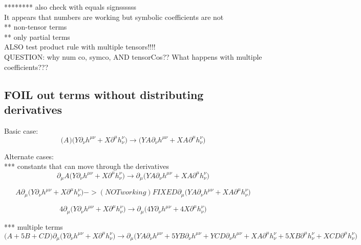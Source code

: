 \documentclass{article}
\def\){\Big)}
\def\({\Big(}
\begin{document}
******** also check with equals signssssss\\
It appears that numbers are working but symbolic coefficients are not\\
** non-tensor terms\\
** only partial terms\\

ALSO test product rule with multiple tensors!!!!\\

QUESTION: why num co, symco, AND tensorCos?? What happens with multiple coefficients???\\

 \subsection{FOIL out terms without distributing derivatives}
Basic case: 
\begin{equation}
\(A^{}\) \(Y \partial_{\nu}h^{\mu \nu} + X \partial^{\mu} h^{\nu }_{\nu}\)  \rightarrow \(Y A^{} \partial_{\nu}h^{\mu \nu} +X A^{} \partial^{\mu}h_{\nu}^{\nu} \)
\end{equation}

Alternate cases:\\
*** constants that can move through the derivatives\\
\begin{equation}
\partial_{\mu} A \(Y \partial_{\nu}h^{\mu \nu} + X \partial^{\mu} h^{\nu }_{\nu}\)   \rightarrow \partial_{\mu}\(YA \partial_{\nu}h^{\mu \nu} +XA \partial^{\mu}h_{\nu}^{\nu} \)
\end{equation}

{\color{red}
\begin{equation}
A \partial_{\mu} \(Y \partial_{\nu}h^{\mu \nu} + X \partial^{\mu} h^{\nu }_{\nu}\) 	-> (NOT working) FIXED \partial_{\mu}\(YA \partial_{\nu}h^{\mu \nu} +XA \partial^{\mu}h_{\nu}^{\nu} \)
\end{equation}
}

\begin{equation}
4 \partial_{\mu}  \(Y \partial_{\nu}h^{\mu \nu} + X \partial^{\mu} h^{\nu }_{\nu}\)   \rightarrow \partial_{\mu}\(4 Y \partial_{\nu}h^{\mu \nu} +4 X \partial^{\mu}h_{\nu}^{\nu} \)
\end{equation}

*** multiple terms
\begin{equation}
\(A + 5B + CD \) \partial_{\mu} \(Y \partial_{\nu}h^{\mu \nu} + X \partial^{\mu} h^{\nu }_{\nu}\) \rightarrow
\partial_{\mu}\(YA \partial_{\nu}h^{\mu \nu} +5 YB \partial_{\nu}h^{\mu \nu} +YCD \partial_{\nu}h^{\mu \nu} +XA \partial^{\mu}h_{\nu}^{\nu} +5 XB \partial^{\mu}h_{\nu}^{\nu} +XCD \partial^{\mu}h_{\nu}^{\nu} \)
\end{equation}
\end{document}
